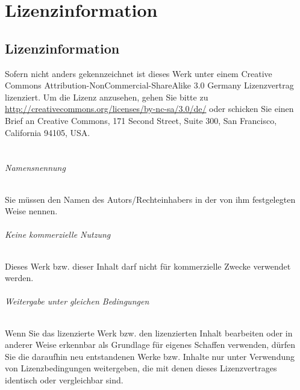 \part {Lizenzinformation}
\chapter {Lizenzinformation}
\label{chapt:Lizenzinformation}
Sofern nicht anders gekennzeichnet ist dieses Werk unter einem Creative Commons Attribution-NonCommercial-ShareAlike 3.0 Germany Lizenzvertrag lizenziert. Um die Lizenz anzusehen, gehen Sie bitte zu \url{http://creativecommons.org/licenses/by-nc-sa/3.0/de/} oder schicken Sie einen Brief an Creative Commons, 171 Second Street, Suite 300, San Francisco, California 94105, USA.
\\
\\
\ccbyncsaeu
\paragraph*{Namensnennung}
Sie müssen den Namen des Autors/Rechteinhabers in der von ihm festgelegten Weise nennen.

\paragraph*{Keine kommerzielle Nutzung}
Dieses Werk bzw. dieser Inhalt darf nicht für kommerzielle Zwecke verwendet werden.

\paragraph*{Weitergabe unter gleichen Bedingungen}
Wenn Sie das lizenzierte Werk bzw. den lizenzierten Inhalt bearbeiten oder in anderer Weise erkennbar als Grundlage für eigenes Schaffen verwenden, dürfen Sie die daraufhin neu entstandenen Werke bzw. Inhalte nur unter Verwendung von Lizenzbedingungen weitergeben, die mit denen dieses Lizenzvertrages identisch oder vergleichbar sind. 
